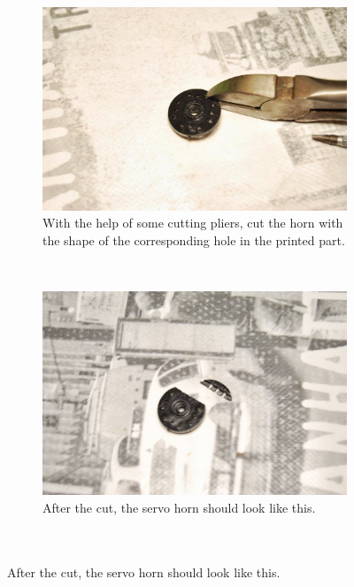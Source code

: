 \begin{figure}[H]
\begin{subfigure}[b]{0.46\textwidth}
        \end{subfigure}
        ~
        \begin{subfigure}[b]{0.46\textwidth}
                \centering
                \includegraphics[width=\textwidth]{images/REPY2_assembly_10.jpg}
                \caption{With the help of some cutting pliers, cut the horn with the shape of the corresponding hole in the printed part.\\}
                \label{fig:hardware_assembly_10}
        \end{subfigure}
        ~
        \begin{subfigure}[b]{0.46\textwidth}
                \centering
                \includegraphics[width=\textwidth]{images/REPY2_assembly_11.jpg}
                \caption{After the cut, the servo horn should look like this.\\~\\~}

\end{subfigure}
\end{figure}

